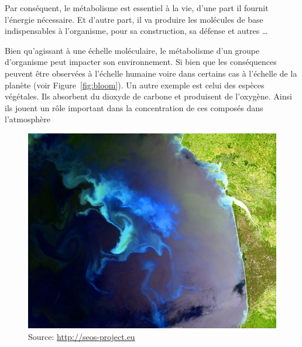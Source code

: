 \begin{refsection}
    Par conséquent, le métabolisme est essentiel à la vie, d'une part il fournit l'énergie nécessaire. Et d'autre part, il va produire les molécules de base indispensables à l'organisme, pour sa construction, sa défense et autres \ldots 
    
    Bien qu'agissant à une échelle moléculaire, le métabolisme d'un groupe d'organisme peut impacter son environnement. Si bien que les conséquences peuvent être observées à l'échelle humaine voire dans certains cas à l'échelle de la planète (voir Figure~\ref{fig:bloom}). Un autre exemple est celui des espèces végétales. Ils absorbent du dioxyde de carbone et produisent de l'oxygène. Ainsi ils jouent un rôle important dans la concentration de ces composés dans l’atmosphère
    
    
    \begin{shadedfigure}
        \begin{subfigure}[b]{.5\textwidth}
            \centering
            \includegraphics[width=\textwidth]{img/bloom_gascogne.jpg}
            \caption{{\tiny Source: \url{http://seos-project.eu}}}
            \label{fig:bloom_gascogne}
        \end{subfigure}
        \hfill
        \begin{subfigure}[b]{.5\textwidth}
            \centering

\end{subfigure}
\end{shadedfigure}
\end{refsection}

